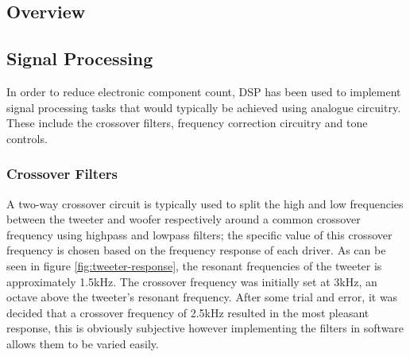 \documentclass[main.tex]{subfiles}
\begin{document}
\subsection{Overview}
\subsection{Signal Processing}
In order to reduce electronic component count, DSP has been used to implement signal processing tasks that would typically be achieved using analogue circuitry.
These include the crossover filters, frequency correction circuitry and tone controls.
\subsubsection{Crossover Filters}
A two-way crossover circuit is typically used to split the high and low frequencies between the tweeter and woofer respectively around a common crossover frequency using highpass and lowpass filters;
the specific value of this crossover frequency is chosen based on the frequency response of each driver.
As can be seen in figure \ref{fig:tweeter-response}, the resonant frequencies of the tweeter is approximately 1.5kHz.
The crossover frequency was initially set at 3kHz, an octave above the tweeter's resonant frequency.
After some trial and error, it was decided that a crossover frequency of 2.5kHz resulted in the most pleasant response, this is obviously subjective however implementing the filters in software allows them to be varied easily.
\end{document}
